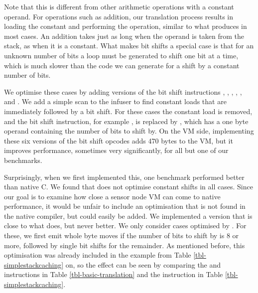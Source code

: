 Note that this is different from other arithmetic operations with a constant operand. For operations such as addition, our translation process results in loading the constant and performing the operation, similar to what  produces in most cases. An addition takes just as long when the operand is taken from the stack, as when it is a constant. What makes bit shifts a special case is that for an unknown number of bits a loop must be generated to shift one bit at a time, which is much slower than the code we can generate for a shift by a constant number of bits.

We optimise these cases by adding  versions of the bit shift instructions , , , , , and . We add a simple scan to the infuser to find constant loads that are immediately followed by a bit shift. For these cases the constant load is removed, and the bit shift instruction, for example , is replaced by , which has a one byte operand containing the number of bits to shift by. On the VM side, implementing these six  versions of the bit shift opcodes adds 470 bytes to the VM, but it improves performance, sometimes very significantly, for all but one of our benchmarks.

Surprisingly, when we first implemented this, one benchmark performed better than native C. We found that  does not optimise constant shifts in all cases. Since our goal is to examine how close a sensor node VM can come to native performance, it would be unfair to include an optimisation that is not found in the native compiler, but could easily be added. We implemented a version that is close to what  does, but never better. We only consider cases optimised by . For these, we first emit whole byte moves if the number of bits to shift by is 8 or more, followed by single bit shifts for the remainder. As mentioned before, this optimisation was already included in the example from Table \ref{tbl-simplestackcaching} on, so the effect can be seen by comparing the  and  instructions in Table \ref{tbl-basic-translation} and the  instruction in Table \ref{tbl-simplestackcaching}.
